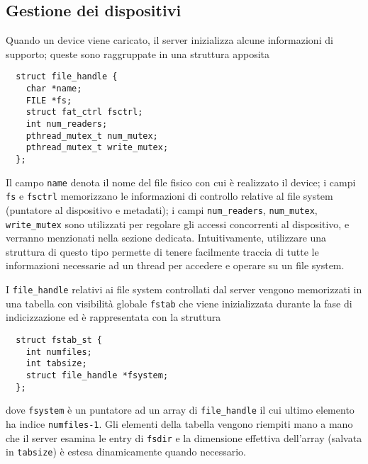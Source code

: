 \documentclass[11pt,oneside,a4paper]{article}
\begin{document}
\subsection{Gestione dei dispositivi}
Quando un device viene caricato, il server inizializza alcune informazioni di supporto; queste sono raggruppate in una struttura apposita
\begin{verbatim}
  struct file_handle {
    char *name;
    FILE *fs;
    struct fat_ctrl fsctrl;
    int num_readers;
    pthread_mutex_t num_mutex;
    pthread_mutex_t write_mutex;
  };
\end{verbatim}
Il campo \texttt{name} denota il nome del file fisico con cui è realizzato il device; i campi \texttt{fs} e \texttt{fsctrl} memorizzano le informazioni di controllo relative al file system (puntatore al dispositivo e metadati); i campi \texttt{num\_readers}, \texttt{num\_mutex}, \texttt{write\_mutex} sono utilizzati per regolare gli accessi concorrenti al dispositivo, e verranno menzionati nella sezione dedicata. Intuitivamente, utilizzare una struttura di questo tipo permette di tenere facilmente traccia di tutte le informazioni necessarie ad un thread per accedere e operare su un file system.

I \texttt{file\_handle} relativi ai file system controllati dal server vengono memorizzati in una tabella con visibilità globale \texttt{fstab} che viene inizializzata durante la fase di indicizzazione ed è rappresentata con la struttura
\begin{verbatim}
  struct fstab_st {
    int numfiles;
    int tabsize;
    struct file_handle *fsystem;
  };
\end{verbatim}
dove \texttt{fsystem} è un puntatore ad un array di \texttt{file\_handle} il cui ultimo elemento ha indice \texttt{numfiles-1}. Gli elementi della tabella vengono riempiti mano a mano che il server esamina le entry di \texttt{fsdir} e la dimensione effettiva dell'array (salvata in \texttt{tabsize}) è estesa dinamicamente quando necessario.
\end{document}
